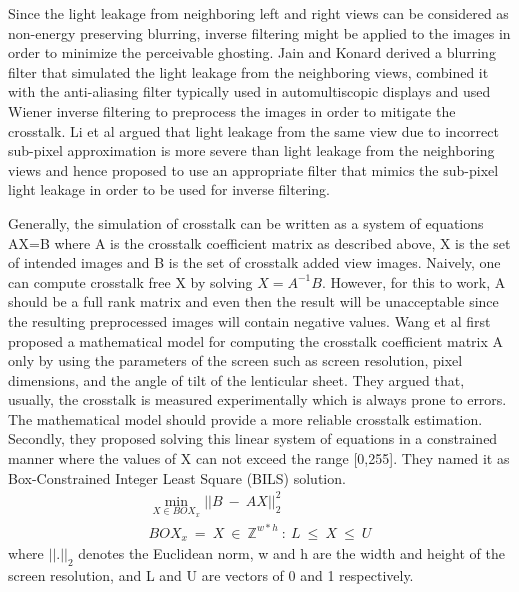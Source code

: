 Since the light leakage from neighboring left and right views can be considered as non-energy preserving blurring, inverse filtering might be applied to the images in order to minimize the perceivable ghosting. Jain and Konard\cite{jain2007crosstalk} derived a blurring filter that simulated the light leakage from the neighboring views, combined it with the anti-aliasing filter typically used in automultiscopic displays and used Wiener inverse filtering to preprocess the images in order to mitigate the crosstalk. Li et al\cite{citation-0} argued that light leakage from the same view due to incorrect sub-pixel approximation is more severe than light leakage from the neighboring views and hence proposed to use an appropriate filter that mimics the sub-pixel light leakage in order to be used for inverse filtering.

Generally, the simulation of crosstalk can be written as a system of equations AX=B where A is the crosstalk coefficient matrix as described above, X is the set of intended images and B is the set of crosstalk added view images. Naively, one can compute crosstalk free X by solving $X=A^{-1}B$. However, for this to work, A should be a full rank matrix and even then the result will be unacceptable since the resulting preprocessed images will contain negative values. Wang et al\cite{wang2014improved} first proposed a mathematical model for computing the crosstalk coefficient matrix A only by using the parameters of the screen such as screen resolution, pixel dimensions, and the angle of tilt of the lenticular sheet. They argued that, usually, the crosstalk is measured experimentally which is always prone to errors. The mathematical model should provide a more reliable crosstalk estimation. Secondly, they proposed solving this linear system of equations in a constrained manner where the values of X can not exceed the range [0,255]. They named it as Box-Constrained Integer Least Square (BILS) solution.
\begin{equation}
\begin{aligned}
\underset{X \in BOX_x}{\operatorname{min}}||B\: -\: AX||_2^2 \\
BOX_x\: = \: {X\: \in \: \mathbb{Z}^{w*h} \: : \: L\: \leq \: X\: \leq\: U }
\end{aligned}
\label{eq:bils}
\end{equation}
where $||.||_2$ denotes the Euclidean norm, w and h are the width and height of the screen resolution, and L and U are vectors of 0 and 1 respectively.